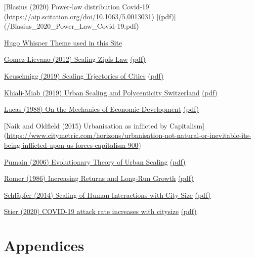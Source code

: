 \documentclass[
]{book}
\begin{document}
{[}Blasius (2020) Power-law distribution Covid-19{]} (\url{https://aip.scitation.org/doi/10.1063/5.0013031})
{[}(pdf){]} (/Blasius\_2020\_Power\_Law\_Covid-19.pdf)

\href{https://themes.gohugo.io/hugo-whisper-theme/}{Hugo Whisper Theme used in this Site}

\href{https://www.researchgate.net/publication/229427747_The_Statistics_of_Urban_Scaling_and_Their_Connection_to_Zipf\%27s_Law}{Gomez-Lievano (2012) Scaling Zipfs Law}
\href{/Gomez-Lievanoetal_2012_Scaling_Zipf.pdf}{(pdf)}

\href{https://www.pnas.org/content/116/28/13759}{Keuschnigg (2019) Scaling Trjectories of Cities}
\href{/Keuschnigg_2019_Scaling_Trjectories_of_Cities.pdf}{(pdf)}

\href{https://journals.plos.org/plosone/article?id=10.1371/journal.pone.0218022\#sec016}{Khiali-Miab (2019) Urban Scaling and Polycenticity Switzerland}
\href{Khiali-Miab_2019_Urban_Scaling_Polycentric_Switzerland.pdf}{(pdf)}

\href{https://www.sciencedirect.com/science/article/abs/pii/030\%204393288901687}{Lucas (1988) On the Mechanics of Economic Development}
\href{/Robert_lucas_1988_On_The_Mechanics_of_Economic_Develøopment.pdf}{(pdf)}

{[}Naik and Oldfield (2015) Urbanisation as inflicted by Capitalism{]} (\url{https://www.citymetric.com/horizons/urbanisation-not-natural-or-inevitable-its-being-inflicted-upon-us-forces-capitalism-900})

\href{https://journals.openedition.org/cybergeo/2519}{Pumain (2006) Evolutionary Theory of Urban Scaling}
\href{/Pumain_2006_Evolutionary_Theory_of_Urban_Scaling.pdf}{(pdf)}

\href{https://www.semanticscholar.org/paper/Increasing-Returns-an\%20d-Long-Run-Growth-Romer/b64575b655cf78cb97afa12eab1001a4a3959117}{Romer (1986) Increasing Returns and Long-Run Growth}
\href{/Paul_Romer_1986_Increasing_Returns_and_Long_Run_Growth.pdf}{(pdf)}

\href{https://royalsocietypublishing.org/doi/full/10.10\%2098/rsif.2013.0789}{Schläpfer (2014) Scaling of Human Interactions with City Size}
\href{/Schlapfer_2014_Scaling_Interactions_City_Size.pdf}{(pdf)}

\href{https://arxiv.org/abs/2003.10376}{Stier (2020) COVID-19 attack rate increases with citysize}
\href{/Stier_2020_COVID-19_Attcak_Rate_City_SIze.pdf}{(pdf)}

\hypertarget{part-appendices}{%
\part{Appendices}\label{part-appendices}}
\end{document}
